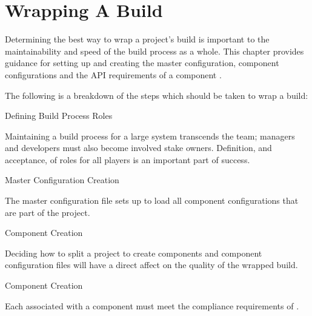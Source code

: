 %
%
%
%
\chapter{Wrapping A Build}\label{chap:wrapping}

Determining the best way to wrap a project's build is important to the
maintainability and speed of the build process as a whole.  This
chapter provides guidance for setting up and creating the master
configuration, component configurations and the API requirements of a
component \makefile.

The following is a breakdown of the steps which should be taken to
wrap a build:

\begin{description}
\item{Defining Build Process Roles}

  Maintaining a build process for a large system transcends the \bni
  team; managers and developers must also become involved stake
  owners.  Definition, and acceptance, of roles for all players is an
  important part of success.

\item{Master Configuration Creation}

  The master configuration file sets up \lmsbw to load all component
  configurations that are part of the project.

\item{Component Creation}

  Deciding how to split a project to create components and component
  configuration files will have a direct affect on the quality of the
  wrapped build.

\item{Component \makefile Creation}

  Each \makefile associated with a component must meet the compliance
  requirements of \lmsbw.

\end{description}

